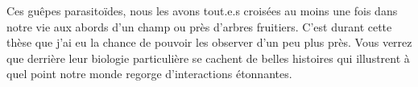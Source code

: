 Ces guêpes parasitoïdes, nous les avons tout.e.s croisées au moins une fois dans notre vie aux abords d'un champ ou près d'arbres fruitiers. C’est durant cette thèse que j’ai eu la chance de pouvoir les observer d’un peu plus près. Vous verrez que derrière leur biologie particulière se cachent de belles histoires qui illustrent à quel point notre monde regorge d'interactions étonnantes.